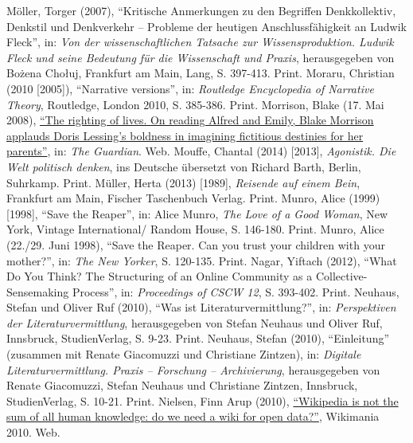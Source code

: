 \documentclass[fontsize=12pt]{scrartcl}
\begin{document}
{{{{\begin{thebibliography}
	M\"oller, Torger (2007), "`Kritische Anmerkungen zu den Begriffen Denkkollektiv, Denkstil und Denkverkehr -- Pro\-ble\-me der heutigen Anschlussf\"ahigkeit an Ludwik Fleck"', in: \textit{Von der wissenschaftlichen Tatsache zur Wissensproduktion. Ludwik Fleck und seine Bedeutung f\"ur die Wissenschaft und Praxis}, he\-rausgegeben von Bo\.{z}ena Cho{\l}uj, Frankfurt am Main, Lang, S. 397-413. Print.
	Moraru, Christian (2010 [2005]), "`Narrative versions"', in: \textit{Routledge Encyclopedia of Narrative Theory}, Routledge, London 2010, S. 385-386. Print.
	Morrison, Blake (17. Mai 2008), \href{http://www.theguardian.com/books/2008/may/17/fiction.dorislessing}{"`The righting of lives. On reading Alfred and Emily, Blake Morrison applauds Doris Lessing's boldness in imagining fictitious destinies for her pa\-rents"'}, in: \textit{The Guardian}. Web.
	Mouffe, Chantal (2014) [2013], \textit{Agonistik. Die Welt politisch denken}, ins Deutsche \"ubersetzt von Richard Barth, Berlin, Suhrkamp. Print.
	M\"uller, Herta (2013) [1989], \textit{Reisende auf einem Bein}, Frankfurt am Main, Fischer Taschenbuch Verlag. Print.
	Munro, Alice (1999) [1998], "`Save the Reaper"', in: Alice Munro, \textit{The Love of a Good Woman}, New York, Vintage International/ Random House, S. 146-180. Print.
	Munro, Alice (22./29. Juni 1998), "`Save the Reaper. Can you trust your children with your mother?"', in: \textit{The New Yorker}, S. 120-135. Print.
	Nagar, Yiftach (2012), "`What Do You Think? The Structuring of an Online Community as a Collective-Sensemaking Process"', in: \textit{Proceedings of CSCW 12}, S. 393-402. Print.
	Neuhaus, Stefan und Oliver Ruf (2010), "`Was ist Li\-te\-ra\-tur\-ver\-mitt\-lung?"', in: \textit{Perspektiven der Li\-te\-ra\-tur\-ver\-mitt\-lung}, he\-rausgegeben von Stefan Neuhaus und Oliver Ruf, Innsbruck, StudienVerlag, S. 9-23. Print.
	Neuhaus, Stefan (2010), "`Einleitung"' (zusammen mit Renate Giacomuzzi und Christiane Zintzen), in: \textit{Digitale Li\-te\-ra\-tur\-ver\-mitt\-lung. Praxis -- For\-schung -- Archivierung}, he\-rausgegeben von Renate Giacomuzzi, Stefan Neuhaus und Christiane Zintzen, Innsbruck, StudienVerlag, S. 10-21. Print.
	Nielsen, Finn Arup (2010), \href{https://en.wikipedia.org/wiki/File:Finn_\%C3\%85rup_Nielsen_-_Wikipedia_is_not_the_sum_of_all_human_knowledge_-_Wikimania_2010.pdf}{"`Wi\-ki\-pe\-dia is not the sum of all human know\-ledge: do we need a wiki for open data?"'}, Wikimania 2010. Web.

\end{thebibliography}}}}}
\end{document}

